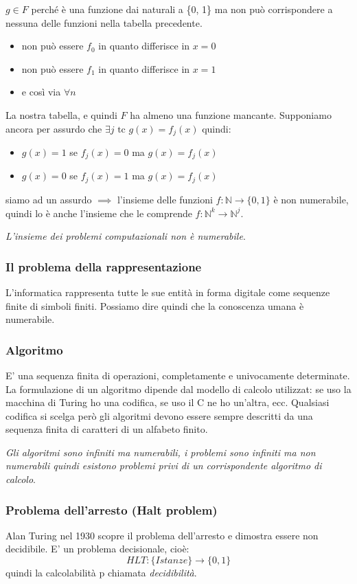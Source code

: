 $g \in F$ perché è una funzione dai naturali a \{0, 1\} ma non può corrispondere a nessuna delle funzioni nella tabella precedente.
\begin{itemize}
    \item non può essere $f_0$ in quanto differisce in $x = 0$
    \item non può essere $f_1$ in quanto differisce in $x = 1$
    \item e così via $\forall n$
\end{itemize}
La nostra tabella, e quindi $F$ ha almeno una funzione mancante. Supponiamo ancora per assurdo che $\exists j \text{ tc } g(x) = f_{j}(x)$ quindi:
\begin{itemize}
    \item $g(x) = 1$ se $f_j(x) = 0$ ma $g(x)=f_j(x)$ 
    \item $g(x) = 0$ se $f_j(x) = 1$ ma $g(x)=f_j(x)$ 
\end{itemize}
siamo ad un assurdo $\implies$ l'insieme delle funzioni $f: \mathbb{N} \longrightarrow \{0, 1\}$ è non numerabile, quindi lo è anche l'insieme che le comprende $f:\mathbb{N}^{k} \longrightarrow \mathbb{N}^{j}$.

\emph{L'insieme dei problemi computazionali non è numerabile}.

\subsubsection{Il problema della rappresentazione}
L'informatica rappresenta tutte le sue entità in forma digitale come sequenze finite di simboli finiti. Possiamo dire quindi che la conoscenza umana è numerabile.

\subsubsection{Algoritmo}
E' una sequenza finita di operazioni, completamente e univocamente determinate. La formulazione di un algoritmo dipende dal modello di calcolo utilizzat: se uso la macchina di Turing ho una codifica, se uso il C ne ho un'altra, ecc. Qualsiasi codifica si scelga però gli algoritmi devono essere sempre descritti da una sequenza finita di caratteri di un alfabeto finito.

\emph{Gli algoritmi sono infiniti ma numerabili, i problemi sono infiniti ma non numerabili quindi esistono problemi privi di un corrispondente algoritmo di calcolo}.

\subsubsection{Problema dell'arresto (Halt problem)}
Alan Turing nel 1930 scopre il problema dell'arresto e dimostra essere non decidibile. E' un problema decisionale, cioè:
$$ HLT:\{Istanze\} \longrightarrow \{0, 1\} $$
quindi la calcolabilità p chiamata \emph{decidibilità}.

